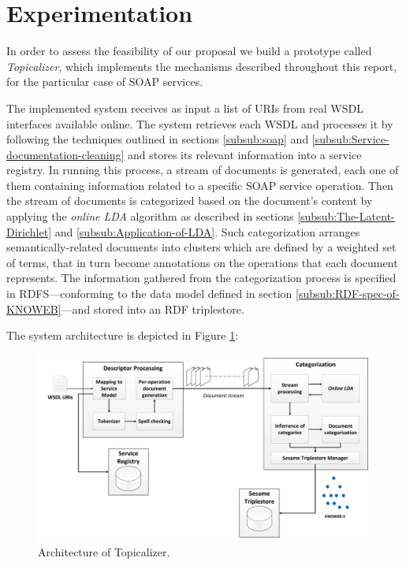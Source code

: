 \section{Experimentation}
\label{sec:experimentation}

\noindent In order to assess the feasibility of our proposal we build a prototype called \emph{Topicalizer}, which implements the mechanisms described throughout this report, for the particular case of SOAP services. 

The implemented system receives as input a list of URIs from real WSDL interfaces available online. The system retrieves each WSDL and processes it by following the techniques outlined in sections \ref{subsub:soap} and \ref{subsub:Service-documentation-cleaning} and stores its relevant information into a service registry. In running this process, a stream of documents is generated, each one of them containing information related to a specific SOAP service operation. Then the stream of documents is categorized based on the document's content by applying the \emph{online LDA} algorithm as described in sections \ref{subsub:The-Latent-Dirichlet} and \ref{subsub:Application-of-LDA}. Such categorization arranges semantically-related documents into clusters which are defined by a weighted set of terms, that in turn become annotations on the operations that each document represents. The information gathered from the categorization process is specified in RDFS---conforming to the data model defined in section \ref{subsub:RDF-spec-of-KNOWEB}---and stored into an RDF triplestore.

The system architecture is depicted in Figure \ref{prototype-architecture}:

\begin{figure}
\begin{center}
 
\includegraphics[scale=0.18]{images/prototype-architecture}

\caption{Architecture of Topicalizer.}
\label{prototype-architecture}
\end{center}
\end{figure}


